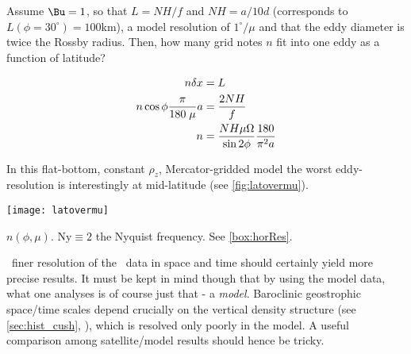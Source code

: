 \begin{infobox}
\label{box:horRes}
Assume $\Bu=1$, so that $L=NH/f$ and $NH=a/10d$ (corresponds to $L(\phi=30^{\circ})=100$km), a model resolution of $1^{\circ}/\mu$ and that the eddy diameter is twice the Rossby radius. Then, how many grid notes $n$ fit into one eddy as a function of latitude?


\begin{align}
	n \delta x
	&=
	L\notag \\
	n  \cos{\phi}  \frac{ \pi}{180\;\mu} a
 	&=
 \frac{2NH }{f} \notag \\ 
	n 
  &=
 \frac{NH \mu \Omega}{ \sin{2\phi}} \frac{180}{\pi^{2} a} 
 \end{align}


In this flat-bottom, constant $\rho_z$, Mercator-gridded model the worst eddy-resolution is interestingly at mid-latitude (see \cref{fig:latovermu}).
\end{infobox}
\begin{marginfigure}[0cm]
\texttt{[image: latovermu]}
\caption{$n(\phi,\mu)$. $\mathrm{Ny}\equiv 2$ \ie the Nyquist frequency. See \cref{box:horRes}.}
\label{fig:latovermu}
\end{marginfigure}
~finer resolution of the \POP~data in space and time should certainly yield more precise results.
It must be kept in mind though that by using the model data, what one analyses is of course just that - a \emph{model}. Baroclinic geostrophic space/time scales depend crucially on \eg the vertical density structure (see \cref{sec:hist_cush}, \citet{Rhines1979}), which is resolved only poorly in the model. A useful comparison among satellite/model results should hence be tricky.   
